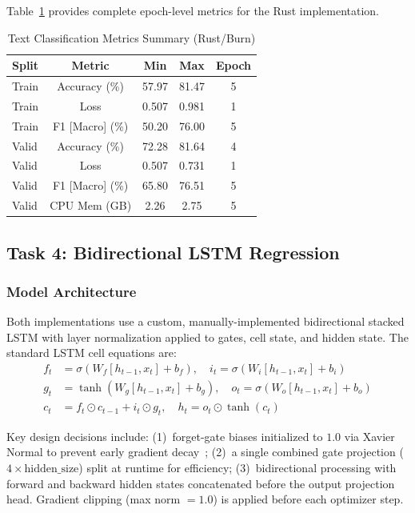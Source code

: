 \documentclass{ieeeaccess}
\begin{document}
Table~\ref{tab:text_metrics} provides complete epoch-level metrics for the Rust implementation.

\begin{table}[htbp]
\centering
\caption{Text Classification Metrics Summary (Rust/Burn)}
\label{tab:text_metrics}
\begin{tabular}{|l|c|c|c|c|}
\hline
\textbf{Split} & \textbf{Metric} & \textbf{Min} & \textbf{Max} & \textbf{Epoch} \\
\hline
Train & Accuracy (\%)   & 57.97 & 81.47 & 5 \\
Train & Loss            & 0.507 & 0.981 & 1 \\
Train & F1 [Macro] (\%) & 50.20 & 76.00 & 5 \\
\hline
Valid & Accuracy (\%)   & 72.28 & 81.64 & 4 \\
Valid & Loss            & 0.507 & 0.731 & 1 \\
Valid & F1 [Macro] (\%) & 65.80 & 76.51 & 5 \\
Valid & CPU Mem (GB)    & 2.26  & 2.75  & 5 \\
\hline
\end{tabular}
\end{table}

\FloatBarrier

\subsection{Task 4: Bidirectional LSTM Regression}

\subsubsection{Model Architecture}

Both implementations use a custom, manually-implemented bidirectional stacked LSTM with layer normalization applied to gates, cell state, and hidden state. The standard LSTM cell equations are:
\begin{align}
    f_t &= \sigma(W_f [h_{t-1}, x_t] + b_f), \quad
    i_t = \sigma(W_i [h_{t-1}, x_t] + b_i) \\
    g_t &= \tanh(W_g [h_{t-1}, x_t] + b_g), \quad
    o_t = \sigma(W_o [h_{t-1}, x_t] + b_o) \\
    c_t &= f_t \odot c_{t-1} + i_t \odot g_t, \quad
    h_t = o_t \odot \tanh(c_t)
\end{align}

Key design decisions include: (1)~forget-gate biases initialized to $1.0$ via Xavier Normal to prevent early gradient decay~\cite{ba2016layernorm}; (2)~a single combined gate projection ($4{\times}\text{hidden\_size}$) split at runtime for efficiency; (3)~bidirectional processing with forward and backward hidden states concatenated before the output projection head. Gradient clipping (max norm $=1.0$) is applied before each optimizer step.
\end{document}
